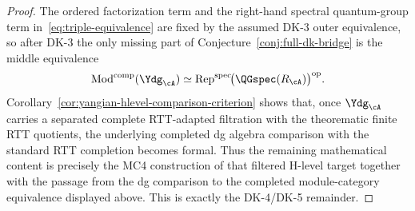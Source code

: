 \begin{proof}
The ordered factorization term and the right-hand spectral quantum-group
term in~\eqref{eq:triple-equivalence} are fixed by the assumed DK-3
outer equivalence, so after DK-3 the only missing part of
Conjecture~\ref{conj:full-dk-bridge} is the middle equivalence
\[
\operatorname{Mod}^{\mathrm{comp}}(\Ydg_{\cA})
\simeq
\operatorname{Rep}^{\mathrm{spec}}\!
  \bigl(\QGspec(R_{\cA})\bigr)^{\mathrm{op}}.
\]
Corollary~\ref{cor:yangian-hlevel-comparison-criterion} shows that, once
$\Ydg_{\cA}$ carries a separated complete RTT-adapted filtration with
the theorematic finite RTT quotients, the underlying completed dg
algebra comparison with the standard RTT completion becomes formal.
Thus the remaining mathematical content is precisely the MC4
construction of that filtered H-level target together with the passage
from the dg comparison to the completed module-category equivalence
displayed above.  This is exactly the DK-4/DK-5 remainder.
\end{proof}

